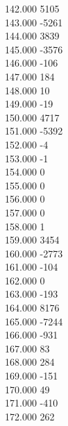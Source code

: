 { 142.000	5105 \\
 143.000	-5261 \\
 144.000	3839 \\
 145.000	-3576 \\
 146.000	-106 \\
 147.000	184 \\
 148.000	10 \\
 149.000	-19 \\
 150.000	4717 \\
 151.000	-5392 \\
 152.000	-4 \\
 153.000	-1 \\
 154.000	0 \\
 155.000	0 \\
 156.000	0 \\
 157.000	0 \\
 158.000	1 \\
 159.000	3454 \\
 160.000	-2773 \\
 161.000	-104 \\
 162.000	0 \\
 163.000	-193 \\
 164.000	8176 \\
 165.000	-7244 \\
 166.000	-931 \\
 167.000	83 \\
 168.000	284 \\
 169.000	-151 \\
 170.000	49 \\
 171.000	-410 \\
 172.000	262 \\
}
